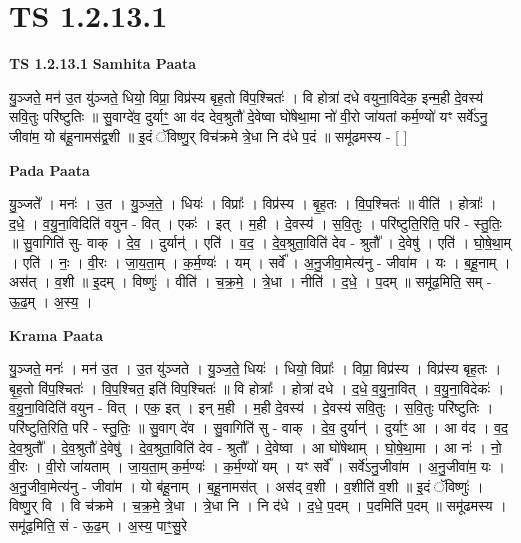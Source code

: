 \documentclass[17pt]{extarticle}
\begin{document}
\section*{ TS 1.2.13.1 }

\textbf{TS 1.2.13.1 } \newline
\textbf{Samhita Paata} \newline

यु॒ञ्जते॒ मन॑ उ॒त यु॑ञ्जते॒ धियो॒ विप्रा॒ विप्र॑स्य बृह॒तो वि॑प॒श्चितः॑ । वि होत्रा॑ दधे वयुना॒विदेक॒ इन्म॒ही दे॒वस्य॑ सवि॒तुः परि॑ष्टुतिः ॥ सु॒वाग्दे॑व॒ दुर्याꣳ॒॒ आ व॑द देव॒श्रुतौ॑ दे॒वेष्वा घो॑षेथा॒मा नो॑ वी॒रो जा॑यतां कर्म॒ण्यो॑ यꣳ सर्वे॑ऽनु॒ जीवा॑म॒ यो ब॑हू॒नामस॑द्व॒शी ॥ इ॒दं ॅविष्णु॒र् विच॑क्रमे त्रे॒धा नि द॑धे प॒दं ॥ समू॑ढमस्य - [ ] \newline

\textbf{Pada Paata} \newline

यु॒ञ्जते᳚ । मनः॑ । उ॒त । यु॒ञ्ज॒ते॒ । धियः॑ । विप्राः᳚ । विप्र॑स्य । बृ॒ह॒तः । वि॒प॒श्चितः॑ ॥ वीति॑ । होत्राः᳚ । द॒धे॒ । व॒यु॒ना॒विदिति॑ वयुन - वित् । एकः॑ । इत् । म॒ही । दे॒वस्य॑ । स॒वि॒तुः । परि॑ष्टुति॒रिति॒ परि॑ - स्तु॒तिः॒ ॥ सु॒वागिति॑ सु- वाक् । दे॒व॒ । दुर्यान्॑ । एति॑ । व॒द॒ । दे॒व॒श्रुता॒विति॑ देव - श्रुतौ᳚ । दे॒वेषु॑ । एति॑ । घो॒षे॒था॒म् । एति॑ । नः॒ । वी॒रः । जा॒य॒ता॒म् । क॒र्म॒ण्यः॑ । यम् । सर्वे᳚ । अ॒नु॒जीवा॒मेत्य॑नु - जीवा॑म । यः । ब॒हू॒नाम् । अस॑त् । व॒शी ॥ इ॒दम् । विष्णुः॑ । वीति॑ । च॒क्र॒मे॒ । त्रे॒धा । नीति॑ । द॒धे॒ । प॒दम् ॥ समू॑ढ॒मिति॒ सम् - ऊ॒ढ॒म् । अ॒स्य॒ ।  \newline


\textbf{Krama Paata} \newline

यु॒ञ्जते॒ मनः॑ । मन॑ उ॒त । उ॒त यु॑ञ्जते । यु॒ञ्ज॒ते॒ धियः॑ । धियो॒ विप्राः᳚ । विप्रा॒ विप्र॑स्य । विप्र॑स्य बृह॒तः । बृ॒ह॒तो वि॑प॒श्चितः॑ । वि॒प॒श्चित॒ इति॑ विप॒श्चितः॑ ॥ वि होत्राः᳚ । होत्रा॑ दधे । द॒धे॒ व॒यु॒ना॒वित् । व॒यु॒ना॒विदेकः॑ । व॒यु॒ना॒विदिति॑ वयुन - वित् । एक॒ इत् । इन् म॒ही । म॒ही दे॒वस्य॑ । दे॒वस्य॑ सवि॒तुः । स॒वि॒तुः परि॑ष्टुतिः । परि॑ष्टुति॒रिति॒ परि॑ - स्तु॒तिः॒ ॥ सु॒वाग् दे॑व । सु॒वागिति॑ सु - वाक् । दे॒व॒ दुर्यान्॑ । दुर्याꣳ॒॒ आ । आ व॑द । व॒द॒ दे॒व॒श्रुतौ᳚ । दे॒व॒श्रुतौ॑ दे॒वेषु॑ । दे॒व॒श्रुता॒विति॑ देव - श्रुतौ᳚ । दे॒वेष्वा । आ घो॑षेथाम् । घो॒षे॒था॒मा । आ नः॑ । नो॒ वी॒रः । वी॒रो जा॑यताम् । जा॒य॒ता॒म् क॒र्म॒ण्यः॑ । क॒र्म॒ण्यो॑ यम् । यꣳ सर्वे᳚ । सर्वे॑ऽनु॒जीवा॑म । अ॒नु॒जीवा॑म॒ यः । अ॒नु॒जीवा॒मेत्य॑नु - जीवा॑म । यो ब॑हू॒नाम् । ब॒हू॒नामस॑त् । अस॑द् व॒शी । व॒शीति॑ व॒शी ॥ इ॒दं ॅविष्णुः॑ । विष्णु॒र् वि । वि च॑क्रमे । च॒क्र॒मे॒ त्रे॒धा । त्रे॒धा नि । नि द॑धे । द॒धे॒ प॒दम् । प॒दमिति॑ प॒दम् ॥ समू॑ढमस्य । समू॑ढ॒मिति॒ सं - ऊ॒ढ॒म् । अ॒स्य॒ पाꣳ॒॒सु॒रे \newline
\end{document}
